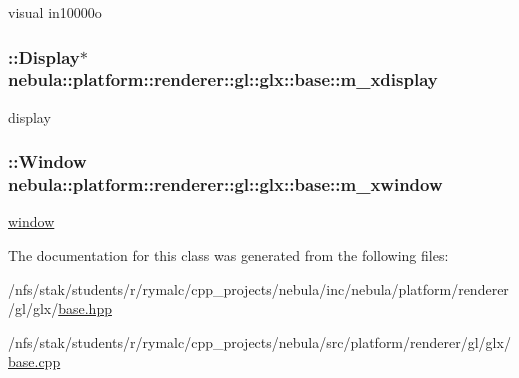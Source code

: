 visual in10000o \hypertarget{classnebula_1_1platform_1_1renderer_1_1gl_1_1glx_1_1base_ac2ab137d52f0925714efeccb04dcc69d}{
\subsubsection[{m\_\-xdisplay}]{\setlength{\rightskip}{0pt plus 5cm}::Display$\ast$ {\bf nebula::platform::renderer::gl::glx::base::m\_\-xdisplay}}}
\label{classnebula_1_1platform_1_1renderer_1_1gl_1_1glx_1_1base_ac2ab137d52f0925714efeccb04dcc69d}


display \hypertarget{classnebula_1_1platform_1_1renderer_1_1gl_1_1glx_1_1base_a2bf236ce2dfd4bbb648094700d4582ec}{
\subsubsection[{m\_\-xwindow}]{\setlength{\rightskip}{0pt plus 5cm}::Window {\bf nebula::platform::renderer::gl::glx::base::m\_\-xwindow}}}
\label{classnebula_1_1platform_1_1renderer_1_1gl_1_1glx_1_1base_a2bf236ce2dfd4bbb648094700d4582ec}


\hyperlink{namespacenebula_1_1platform_1_1window}{window} 

The documentation for this class was generated from the following files:\begin{DoxyCompactItemize}
\item 
/nfs/stak/students/r/rymalc/cpp\_\-projects/nebula/inc/nebula/platform/renderer/gl/glx/\hyperlink{inc_2nebula_2platform_2renderer_2gl_2glx_2base_8hpp}{base.hpp}\item 
/nfs/stak/students/r/rymalc/cpp\_\-projects/nebula/src/platform/renderer/gl/glx/\hyperlink{src_2platform_2renderer_2gl_2glx_2base_8cpp}{base.cpp}\end{DoxyCompactItemize}
